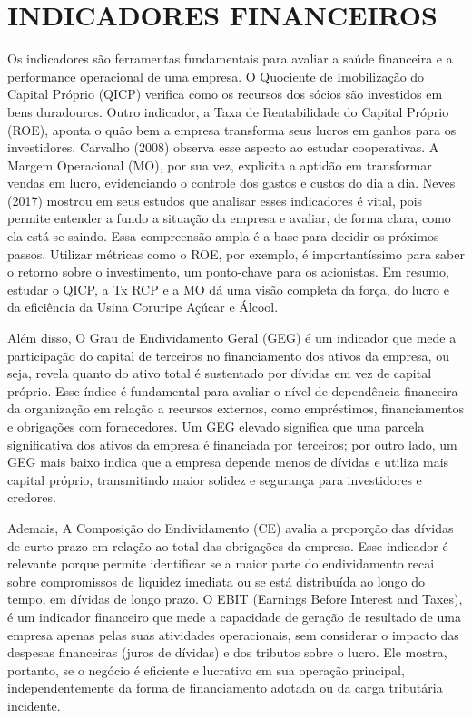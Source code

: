 \documentclass[1pt,a4paper]{article}
\begin{document}
	\section{INDICADORES FINANCEIROS} 
	\setlength{\parindent}{1.5cm} 
	\hspace*{1.5cm} Os indicadores são ferramentas fundamentais para avaliar a saúde financeira e a performance operacional de uma empresa. O Quociente de Imobilização do Capital Próprio (QICP) verifica como os recursos dos sócios são investidos em bens duradouros. Outro indicador, a Taxa de Rentabilidade do Capital Próprio (ROE), aponta o quão bem a empresa transforma seus lucros em ganhos para os investidores. Carvalho (2008) observa esse aspecto ao estudar cooperativas. A Margem Operacional (MO), por sua vez, explicita a aptidão em transformar vendas em lucro, evidenciando o controle dos gastos e custos do dia a dia. Neves (2017) mostrou em seus estudos que analisar esses indicadores é vital, pois permite entender a fundo a situação da empresa e avaliar, de forma clara, como ela está se saindo. Essa compreensão ampla é a base para decidir os próximos passos. Utilizar métricas como o ROE, por exemplo, é importantíssimo para saber o retorno sobre o investimento, um ponto-chave para os acionistas. Em resumo, estudar o QICP, a Tx RCP e a MO dá uma visão completa da força, do lucro e da eficiência da Usina Coruripe Açúcar e Álcool.
	
	Além disso, O Grau de Endividamento Geral (GEG) é um indicador que mede a participação do capital de terceiros no financiamento dos ativos da empresa, ou seja, revela quanto do ativo total é sustentado por dívidas em vez de capital próprio. Esse índice é fundamental para avaliar o nível de dependência financeira da organização em relação a recursos externos, como empréstimos, financiamentos e obrigações com fornecedores. Um GEG elevado significa que uma parcela significativa dos ativos da empresa é financiada por terceiros; por outro lado, um GEG mais baixo indica que a empresa depende menos de dívidas e utiliza mais capital próprio, transmitindo maior solidez e segurança para investidores e credores. 
	
	Ademais, A Composição do Endividamento (CE) avalia a proporção das dívidas de curto prazo em relação ao total das obrigações da empresa. Esse indicador é relevante porque permite identificar se a maior parte do endividamento recai sobre compromissos de liquidez imediata ou se está distribuída ao longo do tempo, em dívidas de longo prazo. O EBIT (Earnings Before Interest and Taxes), é um indicador financeiro que mede a capacidade de geração de resultado de uma empresa apenas pelas suas atividades operacionais, sem considerar o impacto das despesas financeiras (juros de dívidas) e dos tributos sobre o lucro. Ele mostra, portanto, se o negócio é eficiente e lucrativo em sua operação principal, independentemente da forma de financiamento adotada ou da carga tributária incidente. 
	
\end{document}
